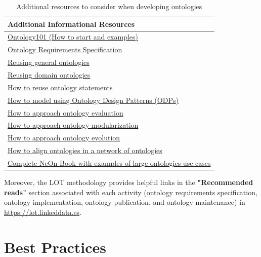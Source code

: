 \documentclass{guideline/sty/rapport}
\begin{document}
\begin{table}[H]
	\centering
	\begin{tabular}{l}
		\hline
		\rowcolor{oceanboatblue!20} 
		\textbf{Additional Informational Resources} \\
		\hline
		\href{https://protege.stanford.edu/publications/ontology_development/ontology101.pdf}{Ontology101 (How to start and examples)} \\
		\href{http://neon-project.org/nw/book-chapters/Chapter-05.pdf}{Ontology Requirements Specification}\\
		\href{http://neon-project.org/nw/book-chapters/Chapter-09.pdf}{Reusing general ontologies}\\
		\href{http://neon-project.org/nw/book-chapters/Chapter-10.pdf}{Reusing domain ontologies}\\
		\href{http://neon-project.org/nw/book-chapters/Chapter-11.pdf}{How to reuse ontology statements}\\
		\href{http://neon-project.org/nw/book-chapters/Chapter-12.pdf}{How to model using Ontology Design Patterns (\ac{ODPs})}\\
        \href{http://neon-project.org/nw/book-chapters/Chapter-14.pdf}{How to approach ontology evaluation}\\
        \href{http://neon-project.org/nw/book-chapters/Chapter-15.pdf}{How to approach ontology modularization}\\
        \href{http://neon-project.org/nw/book-chapters/Chapter-16.pdf}{How to approach ontology evolution}\\
        \href{http://neon-project.org/nw/book-chapters/Chapter-17.pdf}{How to align ontologies in a network of ontologies}\\
        \href{http://neon-project.org/nw/NeOn_Book.html}{Complete NeOn Book with examples of large ontologies use cases}\\
		\hline
	\end{tabular}
    \caption{Additional resources to consider when developing ontologies} 
	\label{tab:additionalresources}
\end{table}

Moreover, the LOT methodology provides helpful links in the \textbf{"Recommended reads"} section associated with each activity (ontology requirements specification, ontology implementation, ontology publication, and ontology maintenance) in \url{https://lot.linkeddata.es}.

\newpage
\section{Best Practices} \label{sec:bestpractices}
\end{document}

